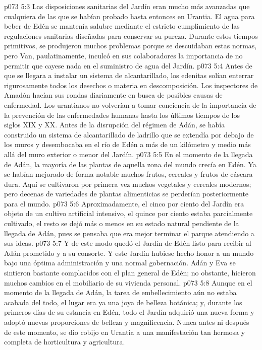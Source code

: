 \vs p073 5:3 Las disposiciones sanitarias del Jardín eran mucho más avanzadas que cualquiera de las que se habían probado hasta entonces en Urantia. El agua para beber de Edén se mantenía salubre mediante el estricto cumplimiento de las regulaciones sanitarias diseñadas para conservar su pureza. Durante estos tiempos primitivos, se produjeron muchos problemas porque se descuidaban estas normas, pero Van, paulatinamente, inculcó en sus colaboradores la importancia de no permitir que cayese nada en el suministro de agua del Jardín.
\vs p073 5:4 Antes de que se llegara a instalar un sistema de alcantarillado, los edenitas solían enterrar rigurosamente todos los desechos o materia en descomposición. Los inspectores de Amadón hacían sus rondas diariamente en busca de posibles causas de enfermedad. Los urantianos no volverían a tomar conciencia de la importancia de la prevención de las enfermedades humanas hasta los últimos tiempos de los siglos XIX y XX. Antes de la disrupción del régimen de Adán, se había construido un sistema de alcantarillado de ladrillo que se extendía por debajo de los muros y desembocaba en el río de Edén a más de un kilómetro y medio más allá del muro exterior o menor del Jardín.
\vs p073 5:5 En el momento de la llegada de Adán, la mayoría de las plantas de aquella zona del mundo crecía en Edén. Ya se habían mejorado de forma notable muchos frutos, cereales y frutos de cáscara dura. Aquí se cultivaron por primera vez muchos vegetales y cereales modernos; pero decenas de variedades de plantas alimenticias se perderían posteriormente para el mundo.
\vs p073 5:6 Aproximadamente, el cinco por ciento del Jardín era objeto de un cultivo artificial intensivo, el quince por ciento estaba parcialmente cultivado, el resto se dejó más o menos en su estado natural pendiente de la llegada de Adán, pues se pensaba que era mejor terminar el parque atendiendo a sus ideas.
\vs p073 5:7 Y de este modo quedó el Jardín de Edén listo para recibir al Adán prometido y a su consorte. Y este Jardín hubiese hecho honor a un mundo bajo una óptima administración y una normal gobernación. Adán y Eva se sintieron bastante complacidos con el plan general de Edén; no obstante, hicieron muchos cambios en el mobiliario de su vivienda personal.
\vs p073 5:8 Aunque en el momento de la llegada de Adán, la tarea de embellecimiento aún no estaba acabada del todo, el lugar era ya una joya de belleza botánica; y, durante los primeros días de su estancia en Edén, todo el Jardín adquirió una nueva forma y adoptó nuevas proporciones de belleza y magnificencia. Nunca antes ni después de este momento, se dio cobijo en Urantia a una manifestación tan hermosa y completa de horticultura y agricultura.
